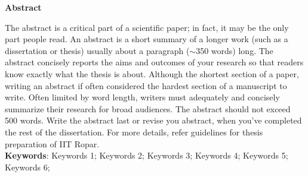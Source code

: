 




\begin{center}
{\LARGE \textbf{Abstract}}
\end{center}


The abstract is a critical part of a scientific paper; in fact, it may be the only part people read. An abstract is a short summary of a longer work (such as a dissertation or thesis) usually about a paragraph ($\sim$350 words) long. The abstract concisely reports the aims and outcomes of your research so that readers know exactly what the thesis is about. Although the shortest section of a paper, writing an abstract if often considered the hardest section of a manuscript to write. Often limited by word length, writers must adequately and concisely summarize their research for broad audiences. The abstract should not exceed 500 words. Write the abstract last or revise you abstract, when you’ve completed the rest of the dissertation. For more details, refer guidelines for thesis preparation of IIT Ropar.\\

\textbf{Keywords}: Keywords 1; Keywords 2; Keywords 3; Keywords 4; Keywords 5; Keywords 6;

\newpage